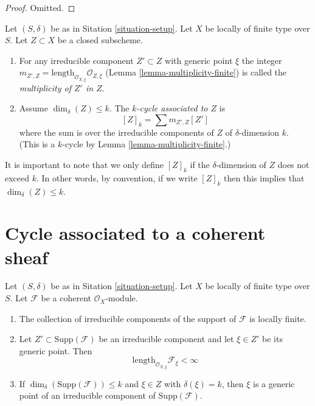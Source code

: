 \begin{proof}
Omitted.
\end{proof}

\begin{definition}
\label{definition-cycle-associated-to-closed-subscheme}
Let $(S, \delta)$ be as in Sitation \ref{situation-setup}.
Let $X$ be locally of finite type over $S$.
Let $Z \subset X$ be a closed subscheme.
\begin{enumerate}
\item For any irreducible component $Z' \subset Z$ with generic point $\xi$
the integer
$m_{Z', Z} = \text{length}_{\mathcal{O}_{X, \xi}} \mathcal{O}_{Z, \xi}$
(Lemma \ref{lemma-multiplicity-finite})
is called the {\it multiplicity of $Z'$ in $Z$}.
\item Assume $\dim_\delta(Z) \leq k$.
The {\it $k$-cycle associated to $Z$} is
$$
[Z]_k
=
\sum m_{Z', Z}[Z']
$$
where the sum is over the irreducible components of $Z$
of $\delta$-dimension $k$. (This is a $k$-cycle by
Lemma \ref{lemma-multiplicity-finite}.)
\end{enumerate}
\end{definition}

\noindent
It is important to note that we only define $[Z]_k$ if the $\delta$-dimension
of $Z$ does not exceed $k$. In other words, by convention, if we write
$[Z]_k$ then this implies that $\dim_\delta(Z) \leq k$.



\section{Cycle associated to a coherent sheaf}
\label{section-cycle-of-coherent-sheaf}



\begin{lemma}
\label{lemma-length-finite}
Let $(S, \delta)$ be as in Sitation \ref{situation-setup}.
Let $X$ be locally of finite type over $S$.
Let $\mathcal{F}$ be a coherent $\mathcal{O}_X$-module.
\begin{enumerate}
\item The collection of irreducible components of the support of
$\mathcal{F}$ is locally finite.
\item Let $Z' \subset \text{Supp}(\mathcal{F})$
be an irreducible component and
let $\xi \in Z'$ be its generic point.
Then
$$
\text{length}_{\mathcal{O}_{X, \xi}} \mathcal{F}_\xi < \infty
$$
\item If $\dim_\delta(\text{Supp}(\mathcal{F})) \leq k$
and $\xi \in Z$ with $\delta(\xi) = k$, then $\xi$ is a
generic point of an irreducible component of $\text{Supp}(\mathcal{F})$.
\end{enumerate}
\end{lemma}

